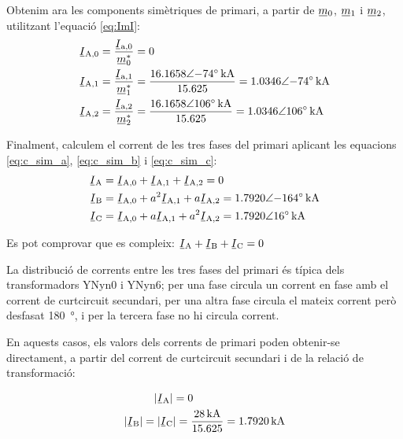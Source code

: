 \begin{exemple}[\CCasimSecTrafo{}]
    Obtenim ara les components simètriques de primari, a partir de $\cmplx{m}_0$, $\cmplx{m}_1$ i $\cmplx{m}_2$, utilitzant l'equació \eqref{eq:ImI}:
    \begin{align*}
        \cmplx{I}\ped{A,0} &= \frac{\cmplx{I}\ped{a,0}}{\cmplx{m}^*_0} = 0 \\
        \cmplx{I}\ped{A,1} &= \frac{\cmplx{I}\ped{a,1}}{\cmplx{m}^*_1} = \frac{\complexqty{16,1658:-74}{kA}}{\num{15,625}} =  \complexqty{1,0346:-74}{kA} \\
        \cmplx{I}\ped{A,2} &= \frac{\cmplx{I}\ped{a,2}}{\cmplx{m}^*_2} = \frac{\complexqty{16,1658:106}{kA}}{\num{15,625}} = \complexqty{1,0346:106}{kA}
    \end{align*}

    Finalment, calculem el corrent de les tres fases del primari aplicant les equacions \eqref{eq:c_sim_a}, \eqref{eq:c_sim_b} i \eqref{eq:c_sim_c}:
     \begin{align*}
        \cmplx{I}\ped{A} &= \cmplx{I}\ped{A,0} + \cmplx{I}\ped{A,1} + \cmplx{I}\ped{A,2} = 0 \\
        \cmplx{I}\ped{B} &= \cmplx{I}\ped{A,0} + a^2 \cmplx{I}\ped{A,1} + a \cmplx{I}\ped{A,2} = \complexqty{1,7920:-164}{kA} \\
        \cmplx{I}\ped{C} &= \cmplx{I}\ped{A,0} + a \cmplx{I}\ped{A,1} + a^2 \cmplx{I}\ped{A,2} = \complexqty{1.7920:16}{kA}
    \end{align*}

    Es pot comprovar que es compleix: $\cmplx{I}\ped{A} + \cmplx{I}\ped{B} + \cmplx{I}\ped{C} = 0$

    La distribució de corrents entre les tres fases del primari és típica dels transformadors YNyn0 i YNyn6; per una fase circula un corrent en fase amb el corrent de curtcircuit secundari, per una altra fase circula el mateix corrent però desfasat \qty{180}{\degree}, i per la tercera fase no hi circula corrent.

    En aquests casos, els valors dels corrents de primari poden obtenir-se directament, a partir del corrent de curtcircuit secundari i de la relació de transformació:

    \begin{align*}
        |\cmplx{I}\ped{A}| &= 0 \\
        |\cmplx{I}\ped{B}| = |\cmplx{I}\ped{C} &|=  \frac{\qty{28}{kA}}{\num{15,625}} = \qty{1,7920}{kA}
    \end{align*}

\end{exemple}



